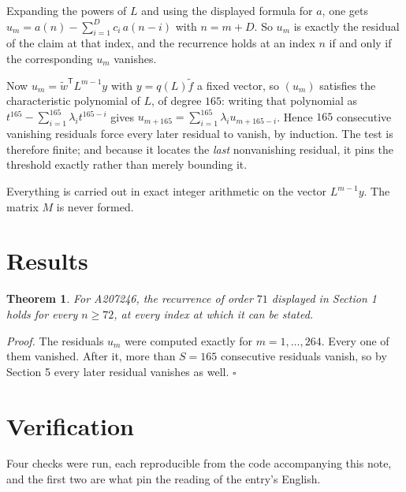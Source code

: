 \documentclass[11pt]{article}
\newtheorem{theorem}{Theorem}
\theoremstyle{definition}
\begin{document}
Expanding the powers of $L$ and using the displayed formula for $a$, one gets $u_m = a(n) - \sum_{i=1}^{D} c_i\,a(n-i)$ with $n = m + D$. So $u_m$ is exactly the residual of the claim at that index, and the recurrence holds at an index $n$ if and only if the corresponding $u_m$ vanishes.

Now $u_m = \tilde w^{\mathsf T} L^{m-1} y$ with $y = q(L)\tilde f$ a fixed vector, so $(u_m)$ satisfies the characteristic polynomial of $L$, of degree $165$: writing that polynomial as $t^{165} - \sum_{i=1}^{165} \lambda_i t^{165-i}$ gives $u_{m+165} = \sum_{i=1}^{165} \lambda_i u_{m+165-i}$. Hence $165$ consecutive vanishing residuals force every later residual to vanish, by induction. The test is therefore finite; and because it locates the {\itshape last} nonvanishing residual, it pins the threshold exactly rather than merely bounding it.

Everything is carried out in exact integer arithmetic on the vector $L^{m-1}y$. The matrix $M$ is never formed.

\section{Results}

\begin{theorem} For A207246, the recurrence of order $71$ displayed in Section 1 holds for every $n \ge 72$, at every index at which it can be stated.\end{theorem}

{\itshape Proof.} The residuals $u_m$ were computed exactly for $m = 1,\dots,264$. Every one of them vanished. After it, more than $S = 165$ consecutive residuals vanish, so by Section 5 every later residual vanishes as well. $\square$

\section{Verification}

Four checks were run, each reproducible from the code accompanying this note, and the first two are what pin the reading of the entry's English.
\end{document}

